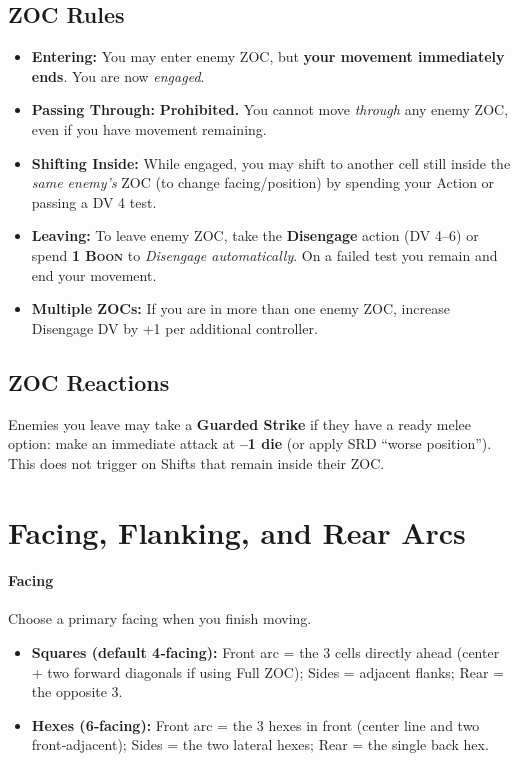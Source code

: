 \documentclass[11pt]{article}
\newcommand{\Boon}{\textsc{Boon}}
\newcommand{\DV}{\textsc{DV}}
\begin{document}
\subsection{ZOC Rules}
\begin{itemize}
  \item \textbf{Entering:} You may enter enemy ZOC, but \textbf{your movement immediately ends}. You are now \emph{engaged}.
  \item \textbf{Passing Through:} \textbf{Prohibited.} You cannot move \emph{through} any enemy ZOC, even if you have movement remaining.
  \item \textbf{Shifting Inside:} While engaged, you may shift to another cell still inside the \emph{same enemy’s} ZOC (to change facing/position) by spending your Action or passing a \DV{} 4 test.
  \item \textbf{Leaving:} To leave enemy ZOC, take the \textbf{Disengage} action (\DV{} 4–6) or spend \textbf{1 \Boon} to \emph{Disengage automatically}. On a failed test you remain and end your movement.
  \item \textbf{Multiple ZOCs:} If you are in more than one enemy ZOC, increase Disengage \DV{} by +1 per additional controller.
\end{itemize}

\subsection{ZOC Reactions}
Enemies you leave may take a \textbf{Guarded Strike} if they have a ready melee option: make an immediate attack at \textbf{–1 die} (or apply SRD “worse position”). This does not trigger on Shifts that remain inside their ZOC.

\section{Facing, Flanking, and Rear Arcs}
\paragraph{Facing}
Choose a primary facing when you finish moving.
\begin{itemize}
  \item \textbf{Squares (default 4‑facing):} Front arc = the 3 cells directly ahead (center + two forward diagonals if using Full ZOC); Sides = adjacent flanks; Rear = the opposite 3.
  \item \textbf{Hexes (6‑facing):} Front arc = the 3 hexes in front (center line and two front‑adjacent); Sides = the two lateral hexes; Rear = the single back hex.
\end{itemize}
\end{document}
